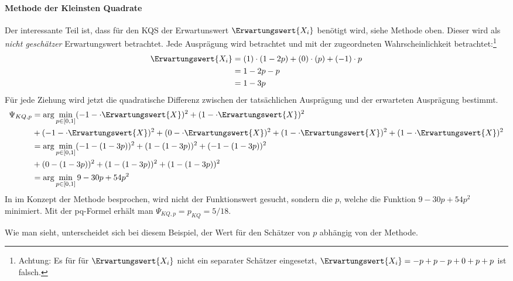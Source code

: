 \paragraph{Methode der Kleinsten Quadrate}
Der interessante Teil ist, dass für den \gls{KQS} der Erwartunswert $\Erwartungswert{X_i}$ benötigt wird, siehe Methode oben. Dieser wird als \textit{nicht geschätzer} Erwartungswert betrachtet. Jede Ausprägung wird betrachtet und mit der zugeordneten Wahrscheinlichkeit betrachtet:\footnote{Achtung: Es für für $\Erwartungswert{X_i}$ nicht ein separater Schätzer eingesetzt, $\Erwartungswert{X_i} = -p + p - p + 0 + p + p$ ist falsch.}
\begin{align}
	\Erwartungswert{X_i} &= (1)\cdot (1-2p) + (0)\cdot (p) + (-1)\cdot p \\
	&=1-2p - p\\
	&=1-3p
\end{align}
Für jede Ziehung wird jetzt die quadratische Differenz zwischen der tatsächlichen Ausprägung und der erwarteten Ausprägung bestimmt.
\begin{align}
	\Psi_{KQ,p} &= \arg\min_{p\in [0,1]}  (-1 - \cdot \Erwartungswert{X})^2 + (1 - \cdot \Erwartungswert{X})^2 \\
	 &+ (-1 - \cdot \Erwartungswert{X})^2 + (0 - \cdot \Erwartungswert{X})^2 + (1 - \cdot \Erwartungswert{X})^2 + (1 - \cdot \Erwartungswert{X})^2\\
	&= \arg\min_{p\in [0,1]}  (-1-(1-3p))^2 + (1 -(1-3p))^2 + (-1 -(1-3p))^2 \\ & + (0 -(1-3p))^2 + (1 -(1-3p))^2 + (1 -(1-3p))^2\\ 
	&= \arg\min_{p\in [0,1]}  9 - 30p +54p^2
\end{align}
In im Konzept der Methode besprochen, wird nicht der Funktionswert gesucht, sondern die $p$, welche die Funktion $9-30p+54p^2$ minimiert. Mit der pq-Formel erhält man $\Psi_{KQ,p} = p_{KQ} = 5/18$.

Wie man sieht, unterscheidet sich bei diesem Beispiel, der Wert für den Schätzer von $p$ abhängig von der Methode.